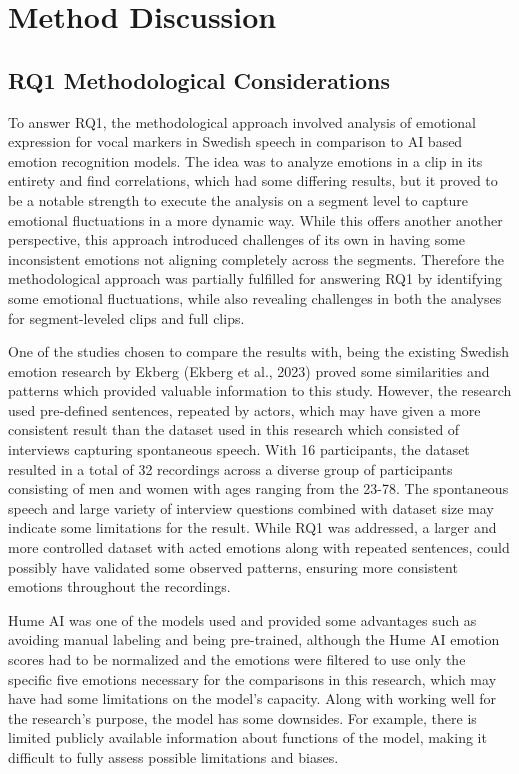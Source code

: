\section{Method Discussion}
\subsection{RQ1 Methodological Considerations}
To answer RQ1, the methodological approach involved analysis of emotional expression for vocal markers in Swedish speech in comparison to AI based emotion recognition models. The idea was to analyze emotions in a clip in its entirety and find correlations, which had some differing results, but it proved to be a notable strength to execute the analysis on a segment level to capture emotional fluctuations in a more dynamic way. While this offers another another perspective, this approach introduced challenges of its own in having some inconsistent emotions not aligning completely across the segments. Therefore the methodological approach was partially fulfilled for answering RQ1 by identifying some emotional fluctuations, while also revealing challenges in both the analyses for segment-leveled clips and full clips.

One of the studies chosen to compare the results with, being the existing Swedish emotion research by Ekberg (Ekberg et al., 2023) proved some similarities and patterns which provided valuable information to this study.  However, the research used pre-defined sentences, repeated by actors, which may have given a more consistent result than the dataset used in this research which consisted of interviews capturing spontaneous speech. With 16 participants, the dataset resulted in a total of 32 recordings across a diverse group of participants consisting of men and women with ages ranging from the 23-78. The spontaneous speech and large variety of interview questions combined with dataset size may indicate some limitations for the result. While RQ1 was addressed, a larger and more controlled dataset with acted emotions along with repeated sentences, could possibly have validated some observed patterns, ensuring more consistent emotions throughout the recordings.

Hume AI was one of the models used and provided some advantages such as avoiding manual labeling and being pre-trained, although the Hume AI emotion scores had to be normalized and the emotions were filtered to use only the specific five emotions necessary for the comparisons in this research, which may have had some limitations on the model’s capacity. Along with working well for the research’s purpose, the model has some downsides. For example, there is limited publicly available information about functions of the model, making it difficult to fully assess possible limitations and biases.

